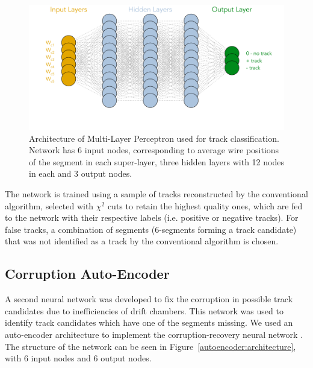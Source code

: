  \begin{figure}[!ht]
\begin{center}
  \includegraphics[width=4.5in]{images/mlp_diagram.pdf}
\caption {Architecture of Multi-Layer Perceptron used for track classification. Network has 6 input nodes, corresponding to average wire positions of the segment in each super-layer, three hidden layers with 12 nodes in each and 3 output nodes.}
 \label{mlp:architecture}
 \end{center}
\end{figure}

The network is trained using a sample of tracks reconstructed by the conventional algorithm, selected with $\chi^2$ cuts to retain the highest quality ones,
which are fed to the network with
their respective labels (i.e. positive or negative tracks). For false tracks, a combination 
of segments (6-segments forming a track candidate) that was not identified as a track by the conventional algorithm is chosen.
 
 \subsection{Corruption Auto-Encoder}
 
A second neural network was developed to fix the corruption in possible track candidates due to 
inefficiencies of drift chambers. This network was used to identify track candidates which have one of the segments
missing. We used an auto-encoder architecture to implement the corruption-recovery neural network \cite{Gavalian:2020xmc}. 
The structure of the network can be seen in Figure~\ref{autoencoder:architecture}, with 6 input nodes and 6 output nodes.

